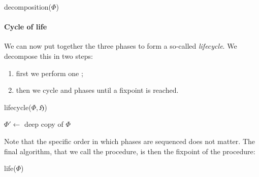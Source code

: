 \begin{scope}
\begin{procedure}[H]
  \caption{decomposition($\Phi$)}
  \BlankLine

\end{procedure}

\paragraph{Cycle of life}

We can now put together the three phases to form a so-called \emph{lifecycle}.
We decompose this in two steps:
\begin{enumerate}
  \item first we perform one ;
  \item then we cycle  and
   phases until a fixpoint is reached.
\end{enumerate}

\begin{procedure}[H]
  \caption{lifecycle($\Phi, \mathfrak{H}$)}
  \BlankLine

  \;
  \BlankLine
  
  $\Phi' \longleftarrow $ deep copy of $\Phi$\;
  \;
  \;
\end{procedure}

Note that the specific order in which phases are sequenced does not matter. The
final algorithm, that we call the  procedure, is then the fixpoint
of the  procedure:

\begin{procedure}[H]
  \caption{life($\Phi$)}
  \BlankLine


\end{procedure}
\end{scope}
